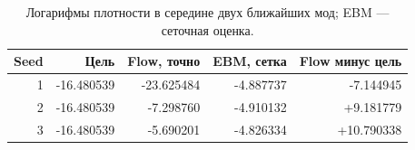\begin{table}[H]\centering\small
\setlength{\tabcolsep}{4pt}
\caption{Логарифмы плотности в середине двух ближайших мод; EBM --- сеточная оценка.}\label{tab:bridge}
\begin{tabular}{rrrrr}
\toprule
Seed & Цель & Flow, точно & EBM, сетка & Flow минус цель \\
\midrule
1 & -16.480539 & -23.625484 & -4.887737 & -7.144945 \\
2 & -16.480539 & -7.298760 & -4.910132 & +9.181779 \\
3 & -16.480539 & -5.690201 & -4.826334 & +10.790338 \\
\bottomrule
\end{tabular}
\end{table}
